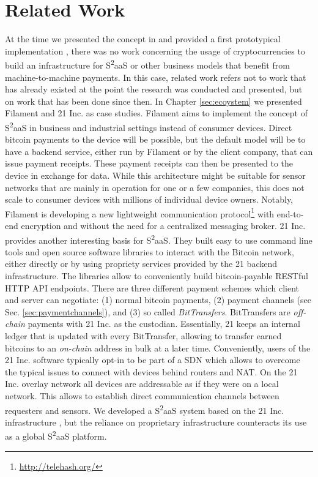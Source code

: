 \section{Related Work}
\label{sec:s2aas_relatedwork}

At the time we presented the concept in \parencite{DBLP:journals/corr/NoyenVWF14} and provided a first prototypical implementation \parencite{Worner:2014:YSE:2638728.2638786}, there was no work concerning the usage of cryptocurrencies to build an infrastructure for S\textsuperscript{2}aaS or other business models that benefit from machine-to-machine payments.
In this case, related work refers not to work that has already existed at the point the research was conducted and presented, but on work that has been done since then. 
In Chapter \ref{sec:ecoystem} we presented Filament and 21 Inc. as case studies. Filament aims to implement the concept of S\textsuperscript{2}aaS in business and industrial settings instead of consumer devices. Direct bitcoin payments to the device will be possible, but the default model will be to have a backend service, either run by Filament or by the client company, that can issue payment receipts. These payment receipts can then be presented to the device in exchange for data. While this architecture might be suitable for sensor networks that are mainly in operation for one or a few companies, this does not scale to consumer devices with millions of individual device owners. Notably, Filament is developing a new lightweight communication protocol\footnote{\url{http://telehash.org/}} with end-to-end encryption and without the need for a centralized messaging broker. 21 Inc. provides another interesting basis for S\textsuperscript{2}aaS. They built easy to use command line tools and open source software libraries to interact with the Bitcoin network, either directly or by using propriety services provided by the 21 backend infrastructure. The libraries allow to conveniently build bitcoin-payable \ac{REST}ful \ac{HTTP} \ac{API} endpoints. There are three different payment schemes which client and server can negotiate: (1) normal bitcoin payments, (2) payment channels (see Sec. \ref{sec:paymentchannels}), and (3) so called \emph{BitTransfers}. BitTransfers are \emph{off-chain} payments with 21 Inc. as the custodian. Essentially, 21 keeps an internal ledger that is updated with every BitTransfer, allowing to transfer earned bitcoins to an \emph{on-chain} address in bulk at a later time. Conveniently, users of the 21 Inc. software typically opt-in to be part of a \ac{SDN} which allows to overcome the typical issues to connect with devices behind routers and \ac{NAT}. On the 21 Inc. overlay network all devices are addressable as if they were on a local network. This allows to establish direct communication channels between requesters and sensors. We developed a S\textsuperscript{2}aaS system based on the 21 Inc. infrastructure \parencite{worner2016design}, but the reliance on proprietary infrastructure counteracts its use as a global S\textsuperscript{2}aaS platform.

